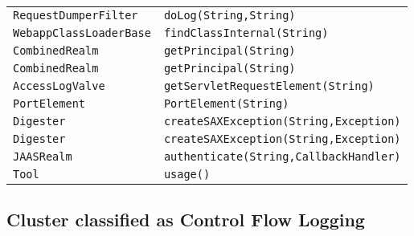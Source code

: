 \begin{center}
\begin{longtable}{ll}
\lstinline/RequestDumperFilter/&{\lstinline/doLog(String,String)/}\\
\lstinline/WebappClassLoaderBase/&{\lstinline/findClassInternal(String)/}\\
\lstinline/CombinedRealm/&{\lstinline/getPrincipal(String)/}\\
\lstinline/CombinedRealm/&{\lstinline/getPrincipal(String)/}\\
\lstinline/AccessLogValve/&{\lstinline/getServletRequestElement(String)/}\\
\lstinline/PortElement/&{\lstinline/PortElement(String)/}\\
\lstinline/Digester/&{\lstinline/createSAXException(String,Exception)/}\\
\lstinline/Digester/&{\lstinline/createSAXException(String,Exception)/}\\
\lstinline/JAASRealm/&{\lstinline/authenticate(String,CallbackHandler)/}\\
\lstinline/Tool/&{\lstinline/usage()/}\\
\end{longtable}
\end{center}

\subsection{Cluster classified as Control Flow Logging}

